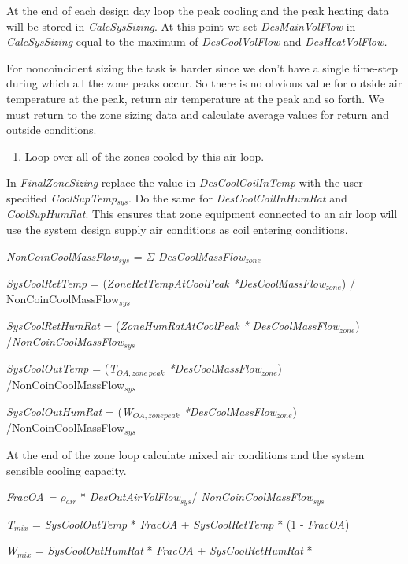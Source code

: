 At the end of each design day loop the peak cooling and the peak heating data will be stored in \emph{CalcSysSizing}. At this point we set \emph{DesMainVolFlow} in \emph{CalcSysSizing} equal to the maximum of \emph{DesCoolVolFlow} and \emph{DesHeatVolFlow.}

For noncoincident sizing the task is harder since we don't have a single time-step during which all the zone peaks occur. So there is no obvious value for outside air temperature at the peak, return air temperature at the peak and so forth. We must return to the zone sizing data and calculate average values for return and outside conditions.

\begin{enumerate}
\def\labelenumi{(\alph{enumi})}
\setcounter{enumi}{1}
\item Loop over all of the zones cooled by this air loop.
\end{enumerate}

In \emph{FinalZoneSizing} replace the value in \emph{DesCoolCoilInTemp} with the user specified \emph{CoolSupTemp\(_{sys}\)}. Do the same for \emph{DesCoolCoilInHumRat} and \emph{CoolSupHumRat}. This ensures that zone equipment connected to an air loop will use the system design supply air conditions as coil entering conditions.

 \emph{NonCoinCoolMassFlow\(_{sys}\)} = $\Sigma$ \emph{DesCoolMassFlow\(_{zone}\)}

 \emph{SysCoolRetTemp} = (\emph{ZoneRetTempAtCoolPeak *DesCoolMassFlow\(_{zone}\)}) / {NonCoinCoolMassFlow\(_{sys}\)}

 \emph{SysCoolRetHumRat} = (\emph{ZoneHumRatAtCoolPeak *} \emph{DesCoolMassFlow\(_{zone}\)}) /\emph{NonCoinCoolMassFlow\(_{sys}\)}

 \emph{SysCoolOutTemp} = (\emph{T\(_{OA,zone\, peak}\) *DesCoolMassFlow\(_{zone}\)}) /NonCoinCoolMassFlow\(_{sys}\)

 \emph{SysCoolOutHumRat} = (\emph{W\(_{OA,zone peak}\) *DesCoolMassFlow\(_{zone}\)}) /NonCoinCoolMassFlow\(_{sys}\)

At the end of the zone loop calculate mixed air conditions and the system sensible cooling capacity.

\emph{FracOA = $\rho$\(_{air}\)} * \emph{DesOutAirVolFlow\(_{sys}\)}/ \emph{NonCoinCoolMassFlow\(_{sys}\)}

\emph{T\(_{mix}\)} = \emph{SysCoolOutTemp} * \emph{FracOA} + \emph{SysCoolRetTemp} * (1 - \emph{FracOA})

\emph{W\(_{mix}\)} = \emph{SysCoolOutHumRat} * \emph{FracOA} + \emph{SysCoolRetHumRat} *

